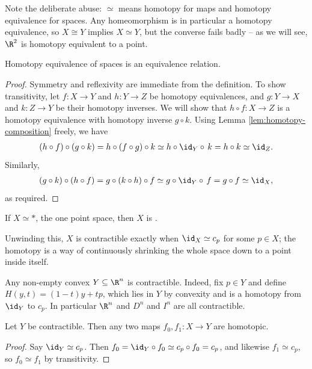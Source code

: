 Note the deliberate abuse: $\simeq$ means homotopy for maps and homotopy equivalence for
spaces. Any homeomorphism is in particular a homotopy equivalence, so $X \cong Y$ implies
$X \simeq Y$, but the converse fails badly -- as we will see, $\R^2$ is homotopy
equivalent to a point.

\begin{proposition}
	Homotopy equivalence of spaces is an equivalence relation.
\end{proposition}
\begin{proof}
	Symmetry and reflexivity are immediate from the definition. To show transitivity, let $f:X \rightarrow Y$ and $h: Y \rightarrow Z$ be homotopy equivalences, and $g: Y \rightarrow X$ and $k: Z \rightarrow Y$ be their homotopy inverses. We will show that $h \circ f : X \rightarrow Z$ is a homotopy equivalence with homotopy inverse $g \circ k$. Using Lemma \ref{lem:homotopy-composition} freely, we have
	\begin{align*}
		(h \circ f) \circ (g \circ k) = h \circ (f \circ g) \circ k \simeq h \circ \id_Y \circ\, k = h \circ k \simeq \id_Z.
	\end{align*}
	Similarly,
	\begin{align*}
		(g \circ k) \circ(h \circ f)=g \circ(k \circ h) \circ f \simeq g \circ \id_Y \circ\, f=g \circ f \simeq \id_X,
	\end{align*}
	as required.
\end{proof}

\begin{definition}[Contractible]
	If $X \simeq *$, the one point space, then $X$ is .
\end{definition}

Unwinding this, $X$ is contractible exactly when $\id_X \simeq c_p$ for some $p \in X$;
the homotopy is a way of continuously shrinking the whole space down to a point inside
itself.

\begin{example}
	Any non-empty convex $Y \subseteq \R^n$ is contractible. Indeed, fix $p \in Y$ and define $H(y, t) = (1-t)y + tp$, which lies in $Y$ by convexity and is a homotopy from $\id_Y$ to $c_p$. In particular $\R^n$ and $D^n$ and $I^n$ are all contractible.
\end{example}

\begin{proposition} \label{prop:contractible-maps}
	Let $Y$ be contractible. Then any two maps $f_0, f_1: X \to Y$ are homotopic.
\end{proposition}
\begin{proof}
	Say $\id_Y \simeq c_p$. Then $f_0 = \id_Y \circ f_0 \simeq c_p \circ f_0 = c_p$, and likewise $f_1 \simeq c_p$, so $f_0 \simeq f_1$ by transitivity.
\end{proof}

